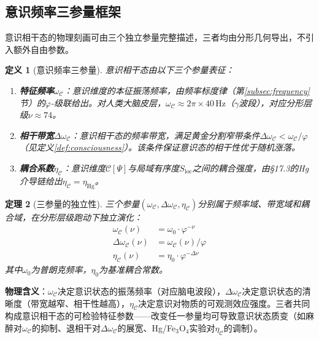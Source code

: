 \documentclass[12pt,a4paper,twocolumn]{article}
\renewcommand{\phi}{\varphi}
\newtheorem{theorem}{定理}[section]
\newtheorem{definition}[theorem]{定义}
\begin{document}
\subsection{意识频率三参量框架}
\label{subsec:three_params}

意识相干态的物理刻画可由三个独立参量完整描述，三者均由分形几何导出，不引入额外自由参数。

\begin{definition}[意识频率三参量]
意识相干态由以下三个参量表征：
\begin{enumerate}
\item \textbf{特征频率}$\omega_{\mathcal{C}}$：意识维度的本征振荡频率，由频率标度律（第\ref{subsec:frequency}节）的$\phi$-级联给出。对人类大脑皮层，$\omega_{\mathcal{C}} \approx 2\pi \times 40\,\text{Hz}$（$\gamma$波段），对应分形层级$\nu \approx 74$。
\item \textbf{相干带宽}$\Delta\omega_{\mathcal{C}}$：意识相干态的频率带宽，满足黄金分割窄带条件$\Delta\omega_{\mathcal{C}} < \omega_{\mathcal{C}}/\phi$（见定义\ref{def:consciousness}）。该条件保证意识态的相干性优于随机涨落。
\item \textbf{耦合系数}$\eta_{\mathcal{C}}$：意识维度$\mathcal{C}[\Psi]$与局域有序度$S_{\text{loc}}$之间的耦合强度，由§17.3的Hg介导链给出$\eta_{\mathcal{C}} = \eta_{\text{Hg}}$。
\end{enumerate}
\end{definition}

\begin{theorem}[三参量的独立性]
三个参量$(\omega_{\mathcal{C}}, \Delta\omega_{\mathcal{C}}, \eta_{\mathcal{C}})$分别属于频率域、带宽域和耦合域，在分形层级跑动下独立演化：
\begin{align}
\omega_{\mathcal{C}}(\nu) &= \omega_0 \cdot \phi^{-\nu} \\
\Delta\omega_{\mathcal{C}}(\nu) &= \omega_{\mathcal{C}}(\nu) / \phi \\
\eta_{\mathcal{C}}(\nu) &= \eta_0 \cdot \phi^{-\Delta\nu}
\end{align}
其中$\omega_0$为普朗克频率，$\eta_0$为基准耦合常数。
\end{theorem}

\noindent\textbf{物理含义}：$\omega_{\mathcal{C}}$决定意识状态的振荡频率（对应脑电波段），$\Delta\omega_{\mathcal{C}}$决定意识状态的清晰度（带宽越窄、相干性越高），$\eta_{\mathcal{C}}$决定意识对物质的可观测效应强度。三者共同构成意识相干态的可检验特征参数——改变任一参量均可导致意识状态质变（如麻醉对$\omega_{\mathcal{C}}$的抑制、退相干对$\Delta\omega_{\mathcal{C}}$的展宽、Hg/Fe$_3$O$_4$实验对$\eta_{\mathcal{C}}$的调制）。
\end{document}
